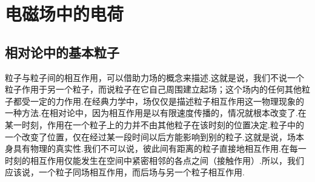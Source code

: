 \chapter{电磁场中的电荷}

\section{相对论中的基本粒子}

粒子与粒子间的相互作用，可以借助力场的概念来描述.这就是说，我们不说一个粒子作用于另一个粒子，而说粒子在它自己周围建立起场；这个场内的任何其他粒子都受一定的力作用.在经典力学中，场仅仅是描述粒子相互作用这一物理现象的一种方法.在相对论中，因为相互作用是以有限速度传播的，情况就根本改变了.在某一时刻，作用在一个粒子上的力并不由其他粒子在该时刻的位置决定.粒子中的一个改变了位置，仅在经过某一段时间以后方能影响到别的粒子.这就是说，场本身具有物理的真实性.我们不可以说，彼此间有距离的粒子直接地相互作用.在每一时刻的相互作用仅能发生在空间中紧密相邻的各点之间（接触作用）.所以，我们应该说，一个粒子同场相互作用，而后场与另一个粒子相互作用.

